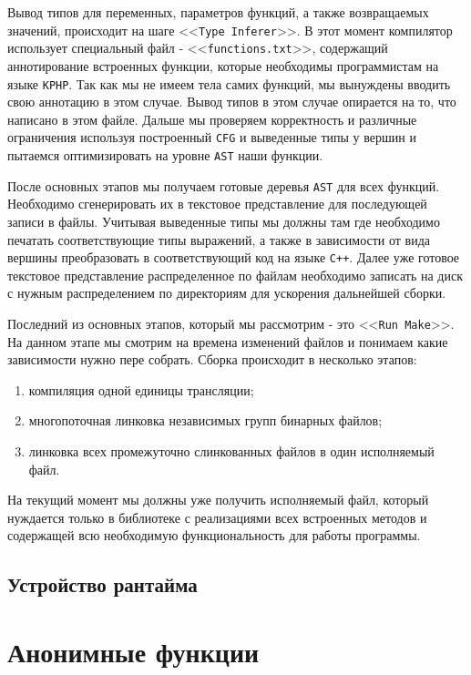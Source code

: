 Вывод типов для переменных, параметров функций, а также возвращаемых значений, происходит на шаге <<\verb|Type Inferer|>>.
В этот момент компилятор использует специальный файл - <<\verb|functions.txt|>>, содержащий аннотирование встроенных функции, которые необходимы программистам на языке \verb|KPHP|.
Так как мы не имеем тела самих функций, мы вынуждены вводить свою аннотацию в этом случае.
Вывод типов в этом случае опирается на то, что написано в этом файле.
Дальше мы проверяем корректность и различные ограничения используя построенный \verb|CFG| и выведенные типы у вершин и пытаемся оптимизировать на уровне \verb|AST| наши функции.

После основных этапов мы получаем готовые деревья \verb|AST| для всех функций.
Необходимо сгенерировать их в текстовое представление для последующей записи в файлы.
Учитывая выведенные типы мы должны там где необходимо печатать соответствующие типы выражений, а также в зависимости от вида вершины преобразовать в соответствующий код на языке \verb|C++|.
Далее уже готовое текстовое представление распределенное по файлам необходимо записать на диск с нужным распределением по директориям для ускорения дальнейшей сборки.

Последний из основных этапов, который мы рассмотрим - это <<\verb|Run Make|>>.
На данном этапе мы смотрим на времена изменений файлов и понимаем какие зависимости нужно пере собрать.
Сборка происходит в несколько этапов:
\begin{enumerate}
  \item компиляция одной единицы трансляции;
  \item многопоточная линковка независимых групп бинарных файлов;
  \item линковка всех промежуточно слинкованных файлов в один исполняемый файл.
\end{enumerate}

На текущий момент мы должны уже получить исполняемый файл, который нуждается только в библиотеке с реализациями всех встроенных методов и содержащей всю необходимую функциональность для работы программы.

\subsection{Устройство рантайма}

\section{Анонимные функции}
